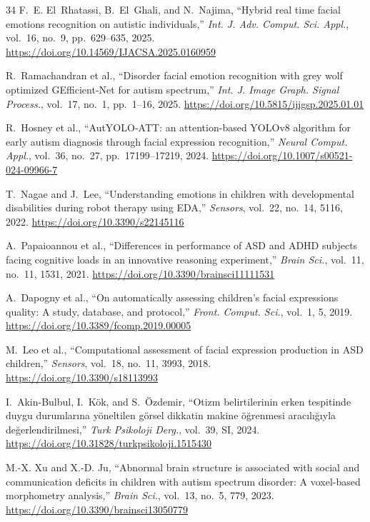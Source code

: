 \documentclass[3p,twocolumn,times]{elsarticle}
\begin{document}
\begin{thebibliography}{34}
		F.~E. El~Rhatassi, B.~El~Ghali, and N.~Najima,
		``Hybrid real time facial emotions recognition on autistic individuals,''
		\textit{Int. J. Adv. Comput. Sci. Appl.}, vol.~16, no.~9, pp.~629--635, 2025.
		\url{https://doi.org/10.14569/IJACSA.2025.0160959}
		
		R.~Ramachandran et al.,
		``Disorder facial emotion recognition with grey wolf optimized GEfficient-Net
		for autism spectrum,''
		\textit{Int. J. Image Graph. Signal Process.}, vol.~17, no.~1, pp.~1--16, 2025.
		\url{https://doi.org/10.5815/ijigsp.2025.01.01}
		
		R.~Hosney et al.,
		``AutYOLO-ATT: an attention-based YOLOv8 algorithm for early autism diagnosis
		through facial expression recognition,''
		\textit{Neural Comput. Appl.}, vol.~36, no.~27, pp.~17199--17219, 2024.
		\url{https://doi.org/10.1007/s00521-024-09966-7}
		
		T.~Nagae and J.~Lee,
		``Understanding emotions in children with developmental disabilities during
		robot therapy using EDA,''
		\textit{Sensors}, vol.~22, no.~14, 5116, 2022.
		\url{https://doi.org/10.3390/s22145116}
		
		A.~Papaioannou et al.,
		``Differences in performance of ASD and ADHD subjects facing cognitive loads
		in an innovative reasoning experiment,''
		\textit{Brain Sci.}, vol.~11, no.~11, 1531, 2021.
		\url{https://doi.org/10.3390/brainsci11111531}
		
		A.~Dapogny et al.,
		``On automatically assessing children's facial expressions quality: A study,
		database, and protocol,''
		\textit{Front. Comput. Sci.}, vol.~1, 5, 2019.
		\url{https://doi.org/10.3389/fcomp.2019.00005}
		
		M.~Leo et al.,
		``Computational assessment of facial expression production in ASD children,''
		\textit{Sensors}, vol.~18, no.~11, 3993, 2018.
		\url{https://doi.org/10.3390/s18113993}
		
		I.~Akin-Bulbul, I.~Kök, and S.~Özdemir,
		``Otizm belirtilerinin erken tespitinde duygu durumlarına yöneltilen görsel
		dikkatin makine öğrenmesi aracılığıyla değerlendirilmesi,''
		\textit{Turk Psikoloji Derg.}, vol.~39, SI, 2024.
		\url{https://doi.org/10.31828/turkpsikoloji.1515430}
		
		M.-X. Xu and X.-D. Ju,
		``Abnormal brain structure is associated with social and communication deficits
		in children with autism spectrum disorder: A voxel-based morphometry analysis,''
		\textit{Brain Sci.}, vol.~13, no.~5, 779, 2023.
		\url{https://doi.org/10.3390/brainsci13050779}
		

\end{thebibliography}
\end{document}
